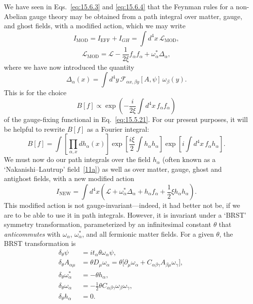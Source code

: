 We have seen in Eqs.~\eqref{eq:15.6.3} and \eqref{eq:15.6.4} that the Feynman rules for a non-Abelian gauge theory may be obtained from a path integral over matter, gauge, and ghost fields, with a modified action, which we may write
\begin{equation}
 I_{\mathrm{MOD}}=I_{\mathrm{EFF}}+I_{GH}=\int d^4x\,\mathcal L_{\mathrm{MOD}},
 \tag{15.7.1}\label{eq:15.7.1}
\end{equation}
\begin{equation}
 \mathcal L_{\mathrm{MOD}}=\mathcal L-\frac{1}{2\xi}f_\alpha f_\alpha+\omega_\alpha^*\Delta_\alpha,
 \tag{15.7.2}\label{eq:15.7.2}
\end{equation}
where we have now introduced the quantity
\begin{equation}
 \Delta_\alpha(x)=\int d^4y\,\mathcal F_{\alpha x,\beta y}[A,\psi]\,\omega_\beta(y).
 \tag{15.7.3}\label{eq:15.7.3}
\end{equation}
This is for the choice
\begin{equation}
 B[f]\propto\exp\left(-\frac{i}{2\xi}\int d^4x\,f_\alpha f_\alpha\right)
 \tag{15.7.4}\label{eq:15.7.4}
\end{equation}
of the gauge-fixing functional in Eq.~\eqref{eq:15.5.21}. For our present purposes, it will be helpful to rewrite $B[f]$ as a Fourier integral:
\begin{equation}
 B[f]=\int\left[\prod_{\alpha,x}dh_\alpha(x)\right]
 \exp\left[\frac{i\xi}{2}\int h_\alpha h_\alpha\right]
 \exp\left[i\int d^4x\,f_\alpha h_\alpha\right].
 \tag{15.7.5}\label{eq:15.7.5}
\end{equation}
We must now do our path integrals over the field $h_\alpha$ (often known as a `Nakanishi--Lautrup' field~\hyperref[ch15-ref-11a]{[11a]}) as well as over matter, gauge, ghost and antighost fields, with a new modified action
\begin{equation}
 I_{\mathrm{NEW}}=\int d^4x\left(\mathcal L+\omega_\alpha^*\Delta_\alpha+h_\alpha f_\alpha+\frac{1}{2}\xi h_\alpha h_\alpha\right).
 \tag{15.7.6}\label{eq:15.7.6}
\end{equation}
This modified action is not gauge-invariant---indeed, it had better not be, if we are to be able to use it in path integrals. However, it is invariant under a `BRST' symmetry transformation, parameterized by an infinitesimal constant $\theta$ that \emph{anticommutes} with $\omega_\alpha$, $\omega_\alpha^*$, and all fermionic matter fields. For a given $\theta$, the BRST transformation is
\begin{align}
 \delta_\theta\psi&=it_\alpha\theta\omega_\alpha\psi,
 &&\tag{15.7.7}\label{eq:15.7.7}\\
 \delta_\theta A_{\alpha\mu}&=\theta D_\mu\omega_\alpha
 =\theta\bigl[\partial_\mu\omega_\alpha+C_{\alpha\beta\gamma}A_{\beta\mu}\omega_\gamma\bigr],
 &&\tag{15.7.8}\label{eq:15.7.8}\\
 \delta_\theta\omega_\alpha^*&=-\theta h_\alpha,
 &&\tag{15.7.9}\label{eq:15.7.9}\\
 \delta_\theta\omega_\alpha&=-\frac{1}{2}\theta C_{\alpha\beta\gamma}\omega_\beta\omega_\gamma,
 &&\tag{15.7.10}\label{eq:15.7.10}\\
 \delta_\theta h_\alpha&=0.
 &&\tag{15.7.11}\label{eq:15.7.11}
\end{align}
